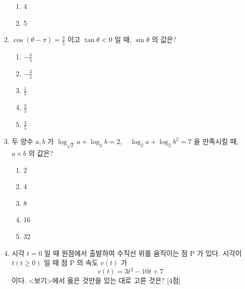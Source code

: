 \documentclass[10.5pt]{article}
\begin{document}
\begin{multicols}{2}
\begin{enumerate}
\begin{minipage}[t]{\linewidth}
\begin{enumerate}[label={\textcircled{\arabic*}}, itemsep=0.2em, topsep=0.2em, leftmargin=*, align=left]
\item 4
\item 5
\end{enumerate}
\par\vspace{12\baselineskip}
\end{minipage}
\item \leavevmode\begin{minipage}[t]{\linewidth}
$\cos (\theta-\pi)=\frac{3}{5}$ 이고 $\tan \theta<0$ 일 때, $\sin \theta$ 의 값은?
\vspace{0.5em}
\begin{enumerate}[label={\textcircled{\arabic*}}, itemsep=0.2em, topsep=0.2em, leftmargin=*, align=left]
\item $-\frac{4}{5}$
\item $-\frac{3}{5}$
\item $\frac{1}{5}$
\item $\frac{3}{5}$
\item $\frac{4}{5}$
\end{enumerate}
\par\vspace{12\baselineskip}
\end{minipage}
\item \leavevmode\begin{minipage}[t]{\linewidth}
두 양수 $a, b$ 가 $\log _{\sqrt{2}} a+\log _{2} b=2, \quad \log _{2} a+\log _{2} b^{2}=7$ 을 만족시킬 때, $a \times b$ 의 값은?
\vspace{0.5em}
\begin{enumerate}[label={\textcircled{\arabic*}}, itemsep=0.2em, topsep=0.2em, leftmargin=*, align=left]
\item 2
\item 4
\item 8
\item 16
\item 32
\end{enumerate}
\par\vspace{12\baselineskip}
\end{minipage}
\item \leavevmode\begin{minipage}[t]{\linewidth}
시각 $t=0$ 일 때 원점에서 출발하여 수직선 위를 움직이는 점 P 가 있다. 시각이 $t(t \geq 0)$ 일 때 점 P 의 속도 $v(t)$ 가
\[v(t)=3 t^{2}-10 t+7\]
이다. <보기>에서 옳은 것만을 있는 대로 고른 것은? [4점]
\begin{tcolorbox}[colback=white, colframe=black, boxrule=0.5pt, arc=2pt, boxsep=3pt, left=4pt, right=4pt, top=3pt, bottom=3pt]

\end{tcolorbox}
\end{minipage}
\end{enumerate}
\end{multicols}
\end{document}
